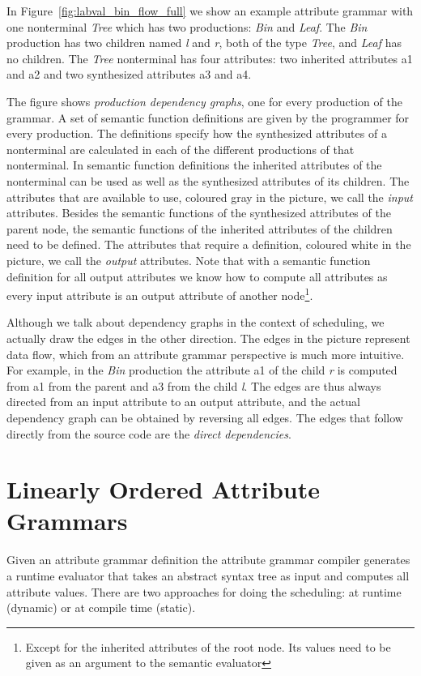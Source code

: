 \documentclass{llncs}
\newcommand{\figref}[1]{Figure~\ref{#1}}
\begin{document}
In \figref{fig:labval_bin_flow_full} we show an example attribute grammar with one nonterminal \emph{Tree} which has two productions: \emph{Bin} and \emph{Leaf}. The \emph{Bin} production has two children named \emph{l} and \emph{r}, both of the type \emph{Tree}, and \emph{Leaf} has no children. The \emph{Tree} nonterminal has four attributes: two inherited attributes a1 and a2 and two synthesized attributes a3 and a4.

The figure shows \emph{production dependency graphs}, one for every production of the grammar. A set of semantic function definitions are given by the programmer for every production. The definitions specify how the synthesized attributes of a nonterminal are calculated in each of the different productions of that nonterminal. In semantic function definitions the inherited attributes of the nonterminal can be used as well as the synthesized attributes of its children. The attributes that are available to use, coloured gray in the picture, we call the \emph{input} attributes. Besides the semantic functions of the synthesized attributes of the parent node, the semantic functions of the inherited attributes of the children need to be defined. The attributes that require a definition, coloured white in the picture, we call the \emph{output} attributes. Note that with a semantic function definition for all output attributes we know how to compute all attributes as every input attribute is an output attribute of another node\footnote{Except for the inherited attributes of the root node. Its values need to be given as an argument to the semantic evaluator}.  

Although we talk about dependency graphs in the context of scheduling, we actually draw the edges in the other direction. The edges in the picture represent data flow, which from an attribute grammar perspective is much more intuitive. For example, in the \emph{Bin} production the attribute a1 of the child \emph{r} is computed from a1 from the parent and a3 from the child \emph{l}. The edges are thus always directed from an input attribute to an output attribute, and the actual dependency graph can be obtained by reversing all edges. The edges that follow directly from the source code are the \emph{direct dependencies}.

\section{Linearly Ordered Attribute Grammars} \label{sect:loag}
Given an attribute grammar definition the attribute grammar compiler generates a runtime evaluator that takes an abstract syntax tree as input and computes all attribute values. There are two approaches for doing the scheduling: at runtime (dynamic) or at compile time (static).
\end{document}
